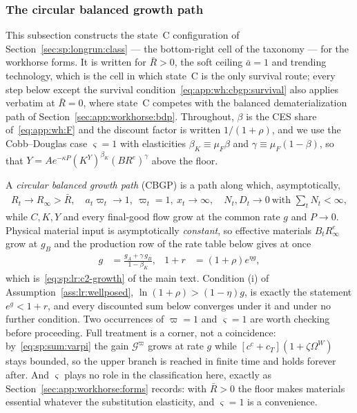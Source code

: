 \subsubsection{The circular balanced growth path}\label{sec:app:workhorse:cbgp}

This subsection constructs the state~C configuration of Section~\ref{sec:sp:longrun:class} --- the bottom-right cell of the taxonomy --- for the workhorse forms. It is written for $\bar R>0$, the soft ceiling $\bar a=1$ and trending technology, which is the cell in which state~C is the only survival route; every step below except the survival condition~\eqref{eq:app:wh:cbgp:survival} also applies verbatim at $\bar R=0$, where state~C competes with the balanced dematerialization path of Section~\ref{sec:app:workhorse:bdp}. Throughout, $\beta$ is the CES share of~\eqref{eq:app:wh:F} and the discount factor is written $1/\left(1+\rho\right)$, and we use the Cobb--Douglas case $\varsigma=1$ with elasticities $\beta_K\equiv\mu_F\beta$ and $\gamma\equiv\mu_F\left(1-\beta\right)$, so that $Y=Ae^{-\kappa P}\left(K^Y\right)^{\beta_K}\left(BR^{e}\right)^{\gamma}$ above the floor.

 A \emph{circular balanced growth path} (CBGP) is a path along which, asymptotically,
\begin{align}
R_t\to R_\infty>\bar R,
\quad
a_t\varpi_t\to1,\ \varpi_t=1,\ x_t\to\infty,
\quad
N_t,D_t\to0\ \text{with }\textstyle\sum_tN_t<\infty,
\label{eq:app:wh:cbgp:ansatz}
\end{align}
while $C,K,Y$ and every final-good flow grow at the common rate $g$ and $P\to0$. Physical material input is asymptotically \emph{constant}, so effective materials $B_tR^e_\infty$ grow at $g_B$ and the production row of the rate table below gives at once
\begin{align}
g &= \frac{g_A+\gamma\,g_B}{1-\beta_K},
&
1+r &= \left(1+\rho\right)e^{\eta g},
\label{eq:app:wh:cbgp:g}
\end{align}
which is~\eqref{eq:sp:lr:c2-growth} of the main text. Condition (i) of Assumption~\ref{ass:lr:wellposed}, $\ln\left(1+\rho\right)>\left(1-\eta\right)g$, is exactly the statement $e^{g}<1+r$, and every discounted sum below converges under it and under no further condition. Two occurrences of $\varpi=1$ and $\varsigma=1$ are worth checking before proceeding. Full treatment is a corner, not a coincidence: by~\eqref{eq:sp:sum:varpi} the gain $\mathcal G^\varpi$ grows at rate $g$ while $\left[c^c+c_T\right]\left(1+\zeta\Omega^W\right)$ stays bounded, so the upper branch is reached in finite time and holds forever after. And $\varsigma$ plays no role in the classification here, exactly as Section~\ref{sec:app:workhorse:forms} records: with $\bar R>0$ the floor makes materials essential whatever the substitution elasticity, and $\varsigma=1$ is a convenience.


